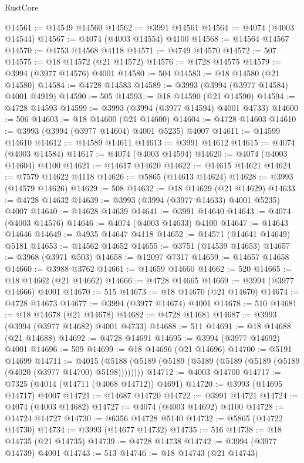 \begin{lexlean}{RustCore}
\begin{coremodule}
@14561 := @14549 @14560
@14562 := @3991 @14561
@14564 := @4074 (@4003 @14544)
@14567 := @4074 (@4003 @14554) @4100
@14568 := @14564 @14567
@14570 := @4753 @14568 @4118
@14571 := @4749 @14570
@14572 := 507
@14575 := @18 @14572 (@21 @14572)
@14576 := @4728 @14575
@14579 := @3994 (@3977 @14576) @4001
@14580 := 504
@14583 := @18 @14580 (@21 @14580)
@14584 := @4728 @14583
@14589 := @3993 (@3994 (@3977 @14584) @4001 @4919)
@14590 := 505
@14593 := @18 @14590 (@21 @14590)
@14594 := @4728 @14593
@14599 := @3993 (@3994 (@3977 @14594) @4001 @4733)
@14600 := 506
@14603 := @18 @14600 (@21 @14600)
@14604 := @4728 @14603
@14610 := @3993 (@3994 (@3977 @14604) @4001 @5235) @4007
@14611 := @14599 @14610
@14612 := @14589 @14611
@14613 := @3991 @14612
@14615 := @4074 (@4003 @14584)
@14617 := @4074 (@4003 @14594)
@14620 := @4074 (@4003 @14604) @4100
@14621 := @14617 @14620
@14622 := @14615 @14621
@14624 := @7579 @14622 @4118
@14626 := @5865 (@14613 @14624)
@14628 := @3993 (@14579 @14626)
@14629 := 508
@14632 := @18 @14629 (@21 @14629)
@14633 := @4728 @14632
@14639 := @3993 (@3994 (@3977 @14633) @4001 @5235) @4007
@14640 := @14628 @14639
@14641 := @3991 @14640
@14643 := @4074 (@4003 @14576)
@14646 := @4074 (@4003 @14633) @4100
@14647 := @14643 @14646
@14649 := @4935 @14647 @4118
@14652 := @14571 (@14641 @14649) @5181
@14653 := @14562 @14652
@14655 := @3751 (@14539 @14653)
@14657 := @3968 (@3971 @503)
@14658 := @12097 @7317
@14659 := @14657 @14658
@14660 := @3988 @3762
@14661 := @14659 @14660
@14662 := 520
@14665 := @18 @14662 (@21 @14662)
@14666 := @4728 @14665
@14669 := @3994 (@3977 @14666) @4001
@14670 := 515
@14673 := @18 @14670 (@21 @14670)
@14674 := @4728 @14673
@14677 := @3994 (@3977 @14674) @4001
@14678 := 510
@14681 := @18 @14678 (@21 @14678)
@14682 := @4728 @14681
@14687 := @3993 (@3994 (@3977 @14682) @4001 @4733)
@14688 := 511
@14691 := @18 @14688 (@21 @14688)
@14692 := @4728 @14691
@14695 := @3994 (@3977 @14692) @4001
@14696 := 509
@14699 := @18 @14696 (@21 @14696)
@14700 := @5191 @14699
@14711 := @4015 (@5188 (@5189 (@5189 (@5189 (@5189 (@5189 (@5189 (@4020 (@3977 @14700) @5198))))))))
@14712 := @4003 @14700
@14717 := @7325 (@4014 (@14711 (@4068 @14712)) @4691)
@14720 := @3993 (@14695 @14717) @4007
@14721 := @14687 @14720
@14722 := @3991 @14721
@14724 := @4074 (@4003 @14682)
@14727 := @4074 (@4003 @14692) @4100
@14728 := @14724 @14727
@14730 := @6356 @14728 @5140
@14732 := @5865 (@14722 @14730)
@14734 := @3993 (@14677 @14732)
@14735 := 516
@14738 := @18 @14735 (@21 @14735)
@14739 := @4728 @14738
@14742 := @3994 (@3977 @14739) @4001
@14743 := 513
@14746 := @18 @14743 (@21 @14743)

\end{coremodule}
\end{lexlean}
